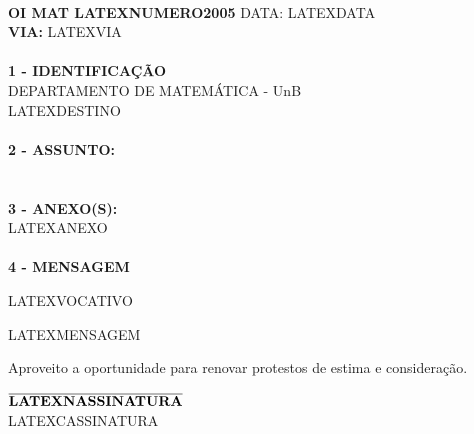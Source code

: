 \addtolength{\oddsidemargin}{-2pc}
\addtolength{\evensidemargin}{2pc}
\setlength{\topmargin}{.5cm}
\setlength{\textwidth}{17cm} 
\setlength{\textheight}{24cm}
\pagestyle{empty}

\vspace*{2mm}
\hspace*{1mm} 
\timbrado
\parindent=2cm 
\setlength{\baselineskip}{5mm}
\noindent 
\vspace*{1cm} \\
\begin{minipage}{17cm}
\vspace*{-8mm}
\parindent=2cm
\setlength{\baselineskip}{5mm}
\vspace*{-8mm}
\noindent
\small
{\bf  OI MAT  LATEXNUMERO\/2005} \hfill {DATA:} {LATEXDATA}
\vum \\
{\bf VIA:} {LATEXVIA}  
\\
\mbox{} \hrulefill\
\\
{\bf 1 - IDENTIFICA\c{C}\~AO} 
\\
\phantom{xxx}{\bf Proced\^encia:} {DEPARTAMENTO DE MATEM\'ATICA - UnB}
\\
 {LATEXDESTINO}
\\
\mbox{} \hrulefill\
\\
{\bf 2 - ASSUNTO:} \\
\phantom{xxx}{LATEXASSUNTO}
\\
\mbox{} \hrulefill\
\\
{\bf 3 - ANEXO(S):} 
\\
\phantom{xxx} {LATEXANEXO} 
\\
\mbox{} \hrulefill\
\\
{ \bf 4 - MENSAGEM} 
\end{minipage}
\setlength{\baselineskip}{6mm}
\vspace*{2.5cm} 

LATEXVOCATIVO\,
\vspace*{10mm}

LATEXMENSAGEM

Aproveito a 
oportunidade para renovar protestos de estima e considera\c{c}\~ao. 
\vspace*{2.5cm} \\
\hspace*{5.5cm} 
\begin{minipage}{10cm}
\setlength{\baselineskip}{4mm}
\begin{center} 
$\overline{\phantom{}
\mbox{\bf  LATEXNASSINATURA}\phantom{}}$ 
\\
LATEXCASSINATURA
\end{center}
\end{minipage}

 
